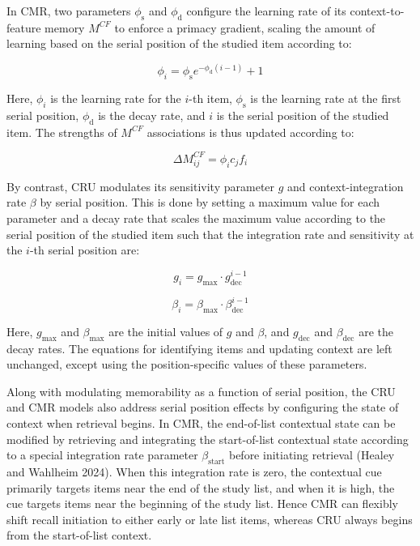 \documentclass[
  letterpaper,
  DIV=11,
  numbers=noendperiod]{scrartcl}
\begin{document}
In CMR, two parameters \(\phi_\text{s}\) and \(\phi_\text{d}\) configure
the learning rate of its context-to-feature memory \(M^{CF}\) to enforce
a primacy gradient, scaling the amount of learning based on the serial
position of the studied item according to:

\[ 
\phi_i = \phi_\text{s} e^{-\phi_\text{d}(i-1)} + 1
\]

Here, \(\phi_i\) is the learning rate for the \(i\)-th item,
\(\phi_\text{s}\) is the learning rate at the first serial position,
\(\phi_\text{d}\) is the decay rate, and \(i\) is the serial position of
the studied item. The strengths of \(M^{CF}\) associations is thus
updated according to:

\[
\Delta M^{CF}_{ij} = \phi_i c_j f_i 
\]

By contrast, CRU modulates its sensitivity parameter \(g\) and
context-integration rate \(\beta\) by serial position. This is done by
setting a maximum value for each parameter and a decay rate that scales
the maximum value according to the serial position of the studied item
such that the integration rate and sensitivity at the \(i\)-th serial
position are:

\[g_i = g_\text{max} \cdot g^{i-1}_\text{dec}\]

\[\beta_i = \beta_\text{max} \cdot \beta^{i-1}_\text{dec}\]

Here, \(g_\text{max}\) and \(\beta_\text{max}\) are the initial values
of \(g\) and \(\beta\), and \(g_\text{dec}\) and \(\beta_\text{dec}\)
are the decay rates. The equations for identifying items and updating
context are left unchanged, except using the position-specific values of
these parameters.

Along with modulating memorability as a function of serial position, the
CRU and CMR models also address serial position effects by configuring
the state of context when retrieval begins. In CMR, the end-of-list
contextual state can be modified by retrieving and integrating the
start-of-list contextual state according to a special integration rate
parameter \(\beta_\text{start}\) before initiating retrieval (Healey and
Wahlheim 2024). When this integration rate is zero, the contextual cue
primarily targets items near the end of the study list, and when it is
high, the cue targets items near the beginning of the study list. Hence
CMR can flexibly shift recall initiation to either early or late list
items, whereas CRU always begins from the start-of-list context.
\end{document}
